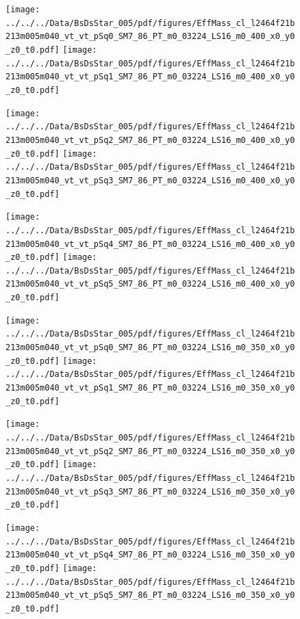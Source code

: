 \documentclass[a4paper,10pt]{article}
\begin{document}
\begin{figure}[p]
 \texttt{[image: ../../../Data/BsDsStar\_005/pdf/figures/EffMass\_cl\_l2464f21b213m005m040\_vt\_vt\_pSq0\_SM7\_86\_PT\_m0\_03224\_LS16\_m0\_400\_x0\_y0\_z0\_t0.pdf]} 
 \texttt{[image: ../../../Data/BsDsStar\_005/pdf/figures/EffMass\_cl\_l2464f21b213m005m040\_vt\_vt\_pSq1\_SM7\_86\_PT\_m0\_03224\_LS16\_m0\_400\_x0\_y0\_z0\_t0.pdf]} 
 \end{figure}
\begin{figure}[p]
 \texttt{[image: ../../../Data/BsDsStar\_005/pdf/figures/EffMass\_cl\_l2464f21b213m005m040\_vt\_vt\_pSq2\_SM7\_86\_PT\_m0\_03224\_LS16\_m0\_400\_x0\_y0\_z0\_t0.pdf]} 
 \texttt{[image: ../../../Data/BsDsStar\_005/pdf/figures/EffMass\_cl\_l2464f21b213m005m040\_vt\_vt\_pSq3\_SM7\_86\_PT\_m0\_03224\_LS16\_m0\_400\_x0\_y0\_z0\_t0.pdf]} 
 \end{figure}
\begin{figure}[p]
 \texttt{[image: ../../../Data/BsDsStar\_005/pdf/figures/EffMass\_cl\_l2464f21b213m005m040\_vt\_vt\_pSq4\_SM7\_86\_PT\_m0\_03224\_LS16\_m0\_400\_x0\_y0\_z0\_t0.pdf]} 
 \texttt{[image: ../../../Data/BsDsStar\_005/pdf/figures/EffMass\_cl\_l2464f21b213m005m040\_vt\_vt\_pSq5\_SM7\_86\_PT\_m0\_03224\_LS16\_m0\_400\_x0\_y0\_z0\_t0.pdf]} 
 \end{figure}
\clearpage
\begin{figure}[p]
 \texttt{[image: ../../../Data/BsDsStar\_005/pdf/figures/EffMass\_cl\_l2464f21b213m005m040\_vt\_vt\_pSq0\_SM7\_86\_PT\_m0\_03224\_LS16\_m0\_350\_x0\_y0\_z0\_t0.pdf]} 
 \texttt{[image: ../../../Data/BsDsStar\_005/pdf/figures/EffMass\_cl\_l2464f21b213m005m040\_vt\_vt\_pSq1\_SM7\_86\_PT\_m0\_03224\_LS16\_m0\_350\_x0\_y0\_z0\_t0.pdf]} 
 \end{figure}
\begin{figure}[p]
 \texttt{[image: ../../../Data/BsDsStar\_005/pdf/figures/EffMass\_cl\_l2464f21b213m005m040\_vt\_vt\_pSq2\_SM7\_86\_PT\_m0\_03224\_LS16\_m0\_350\_x0\_y0\_z0\_t0.pdf]} 
 \texttt{[image: ../../../Data/BsDsStar\_005/pdf/figures/EffMass\_cl\_l2464f21b213m005m040\_vt\_vt\_pSq3\_SM7\_86\_PT\_m0\_03224\_LS16\_m0\_350\_x0\_y0\_z0\_t0.pdf]} 
 \end{figure}
\begin{figure}[p]
 \texttt{[image: ../../../Data/BsDsStar\_005/pdf/figures/EffMass\_cl\_l2464f21b213m005m040\_vt\_vt\_pSq4\_SM7\_86\_PT\_m0\_03224\_LS16\_m0\_350\_x0\_y0\_z0\_t0.pdf]} 
 \texttt{[image: ../../../Data/BsDsStar\_005/pdf/figures/EffMass\_cl\_l2464f21b213m005m040\_vt\_vt\_pSq5\_SM7\_86\_PT\_m0\_03224\_LS16\_m0\_350\_x0\_y0\_z0\_t0.pdf]} 
 \end{figure}
\end{document}
